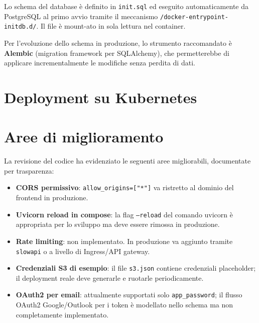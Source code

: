 Lo schema del database \`e definito in \texttt{init.sql} ed eseguito automaticamente
da PostgreSQL al primo avvio tramite il meccanismo
\texttt{/docker-entrypoint-initdb.d/}. Il file \`e mount-ato in sola lettura nel container.

Per l'evoluzione dello schema in produzione, lo strumento raccomandato \`e
\textbf{Alembic} (migration framework per SQLAlchemy), che permetterebbe di applicare
incrementalmente le modifiche senza perdita di dati. 

\section{Deployment su Kubernetes}
\label{sec:kubernetes}


\section{Aree di miglioramento}
\label{sec:miglioramenti}

La revisione del codice ha evidenziato le seguenti aree migliorabili, documentate
per trasparenza:

\begin{itemize}[leftmargin=*]
    \item \textbf{CORS permissivo}: \texttt{allow\_origins=["*"]} va ristretto al
          dominio del frontend in produzione.
    \item \textbf{Uvicorn reload in compose}: la flag \texttt{--reload} del comando
          uvicorn \`e appropriata per lo sviluppo ma deve essere rimossa in produzione.
    \item \textbf{Rate limiting}: non implementato. In produzione va aggiunto tramite
          \texttt{slowapi} o a livello di Ingress/API gateway.
    \item \textbf{Credenziali S3 di esempio}: il file \texttt{s3.json} contiene
          credenziali placeholder; il deployment reale deve generarle e ruotarle
          periodicamente.
    \item \textbf{OAuth2 per email}: attualmente supportati solo \texttt{app\_password};
          il flusso OAuth2 Google/Outlook per i token \`e modellato nello schema ma
          non completamente implementato.
\end{itemize}
